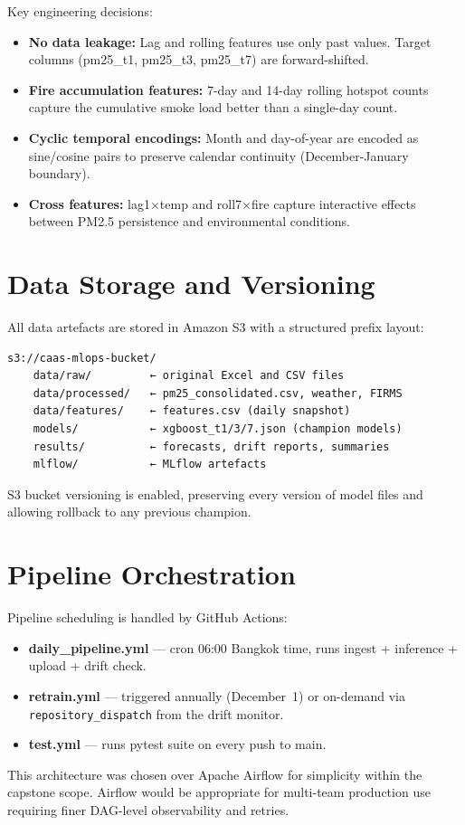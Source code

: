Key engineering decisions:
\begin{itemize}
    \item \textbf{No data leakage:} Lag and rolling features use only past values.
          Target columns (pm25\_t1, pm25\_t3, pm25\_t7) are forward-shifted.
    \item \textbf{Fire accumulation features:} 7-day and 14-day rolling hotspot
          counts capture the cumulative smoke load better than a single-day count.
    \item \textbf{Cyclic temporal encodings:} Month and day-of-year are encoded
          as sine/cosine pairs to preserve calendar continuity (December-January
          boundary).
    \item \textbf{Cross features:} lag1$\times$temp and roll7$\times$fire capture
          interactive effects between PM2.5 persistence and environmental conditions.
\end{itemize}

\section{Data Storage and Versioning}

All data artefacts are stored in Amazon S3 with a structured prefix layout:

\begin{verbatim}
s3://caas-mlops-bucket/
    data/raw/         ← original Excel and CSV files
    data/processed/   ← pm25_consolidated.csv, weather, FIRMS
    data/features/    ← features.csv (daily snapshot)
    models/           ← xgboost_t1/3/7.json (champion models)
    results/          ← forecasts, drift reports, summaries
    mlflow/           ← MLflow artefacts
\end{verbatim}

S3 bucket versioning is enabled, preserving every version of model files
and allowing rollback to any previous champion.

\section{Pipeline Orchestration}

Pipeline scheduling is handled by GitHub Actions:
\begin{itemize}
    \item \textbf{daily\_pipeline.yml} --- cron 06:00 Bangkok time, runs ingest +
          inference + upload + drift check.
    \item \textbf{retrain.yml} --- triggered annually (December~1) or on-demand
          via \texttt{repository\_dispatch} from the drift monitor.
    \item \textbf{test.yml} --- runs pytest suite on every push to main.
\end{itemize}

This architecture was chosen over Apache Airflow for simplicity within the
capstone scope. Airflow would be appropriate for multi-team production use
requiring finer DAG-level observability and retries.
